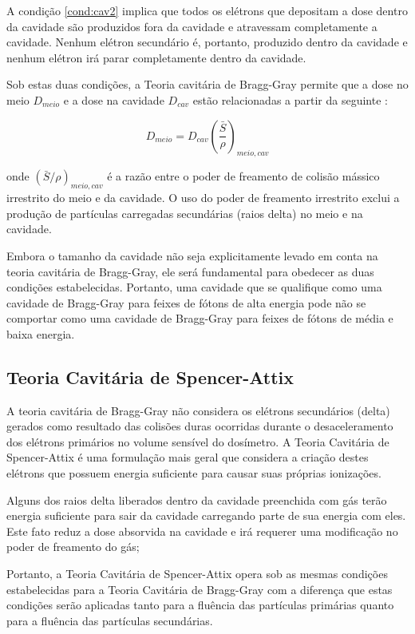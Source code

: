 \documentclass[11pt,a4paper]{article}
\begin{document}
			A condição \ref{cond:cav2} implica que todos os elétrons que depositam a dose dentro da cavidade são produzidos fora da cavidade e atravessam completamente a cavidade. Nenhum elétron secundário é, portanto, produzido dentro da cavidade e nenhum elétron irá parar completamente dentro da cavidade. 

			Sob estas duas condições, a Teoria cavitária de Bragg-Gray permite que a dose no meio $D_{meio}$ e a dose na cavidade $D_{cav}$ estão relacionadas a partir da seguinte  :

				\begin{equation}
					D_{meio} = D_{cav} \left(\frac{\bar{S}}{\rho}\right)_{meio, cav}
				\end{equation}

			\noindent onde $(\bar{S}/\rho)_{meio,cav}$ é a razão entre o poder de freamento de colisão mássico irrestrito do meio e da cavidade. O uso do poder de freamento irrestrito exclui a produção de partículas carregadas secundárias (raios delta) no meio e na cavidade.


			Embora o tamanho da cavidade não seja explicitamente levado em conta na teoria cavitária de Bragg-Gray, ele será fundamental para obedecer as duas condições estabelecidas. Portanto, uma cavidade que se qualifique como uma cavidade de Bragg-Gray para feixes de fótons de alta energia pode não se comportar como uma cavidade de Bragg-Gray para feixes de fótons de média e baixa energia.


		\subsection*{Teoria Cavitária de Spencer-Attix}

			A teoria cavitária de Bragg-Gray não considera os elétrons secundários (delta) gerados como resultado das colisões duras ocorridas durante o desaceleramento dos elétrons primários no volume sensível do dosímetro. A Teoria Cavitária de Spencer-Attix é uma formulação mais geral que considera a criação destes elétrons que possuem energia suficiente para causar suas próprias ionizações. 

			Alguns dos raios delta liberados dentro da cavidade preenchida com gás terão energia suficiente para sair da cavidade carregando parte de sua energia com eles. Este fato reduz a dose absorvida na cavidade e irá requerer uma modificação no poder de freamento do gás; 

			Portanto, a Teoria Cavitária de Spencer-Attix opera sob as mesmas condições estabelecidas para a Teoria Cavitária de Bragg-Gray com a diferença que estas condições serão aplicadas tanto para a fluência das partículas primárias quanto para a fluência das partículas secundárias.
\end{document}

